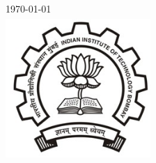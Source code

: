 \begin{titlepage}


{\large \today}\\[1cm] %


\includegraphics[width=5.5cm, height=5.5cm]{iitb.jpg}\\[1cm] %
 

\vfill %

\end{titlepage}


%

